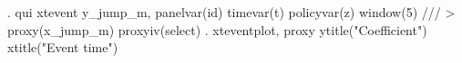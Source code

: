 . qui xtevent y_jump_m, panelvar(id) timevar(t) policyvar(z) window(5) ///
>         proxy(x_jump_m) proxyiv(select)
{\smallskip}
. xteventplot, proxy ytitle("Coefficient") xtitle("Event time")
